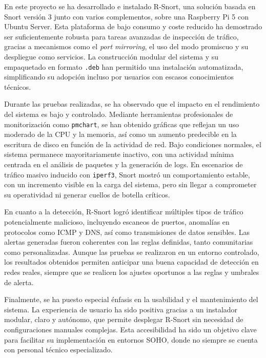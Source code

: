 \documentclass[11pt,a4paper,twoside]{report}
\begin{document}
En este proyecto se ha desarrollado e instalado R-Snort, una solución basada en Snort versión 3 junto con varios complementos, sobre una Raspberry Pi 5 con Ubuntu Server. Esta plataforma de bajo consumo y coste reducido ha demostrado ser suficientemente robusta para tareas avanzadas de inspección de tráfico, gracias a mecanismos como el \textit{port mirroring}, el uso del modo promiscuo y su despliegue como servicios. La construcción modular del sistema y su empaquetado en formato \texttt{.deb} han permitido una instalación automatizada, simplificando su adopción incluso por usuarios con escasos conocimientos técnicos.\newline

Durante las pruebas realizadas, se ha observado que el impacto en el rendimiento del sistema es bajo y controlado. Mediante herramientas profesionales de monitorización como \texttt{pmchart}, se han obtenido gráficas que reflejan un uso moderado de la CPU y la memoria, así como un aumento predecible en la escritura de disco en función de la actividad de red. Bajo condiciones normales, el sistema permanece mayoritariamente inactivo, con una actividad mínima centrada en el análisis de paquetes y la generación de logs. En escenarios de tráfico masivo inducido con \texttt{iperf3}, Snort mostró un comportamiento estable, con un incremento visible en la carga del sistema, pero sin llegar a comprometer su operatividad ni generar cuellos de botella críticos.\newline

En cuanto a la detección, R-Snort logró identificar múltiples tipos de tráfico potencialmente malicioso, incluyendo escaneos de puertos, anomalías en protocolos como ICMP y DNS, así como transmisiones de datos sensibles. Las alertas generadas fueron coherentes con las reglas definidas, tanto comunitarias como personalizadas. Aunque las pruebas se realizaron en un entorno controlado, los resultados obtenidos permiten anticipar una buena capacidad de detección en redes reales, siempre que se realicen los ajustes oportunos a las reglas y umbrales de alerta.\newline

Finalmente, se ha puesto especial énfasis en la usabilidad y el mantenimiento del sistema. La experiencia de usuario ha sido positiva gracias a un instalador modular, claro y autónomo, que permite desplegar R-Snort sin necesidad de configuraciones manuales complejas. Esta accesibilidad ha sido un objetivo clave para facilitar su implementación en entornos SOHO, donde no siempre se cuenta con personal técnico especializado.\newline
\end{document}
